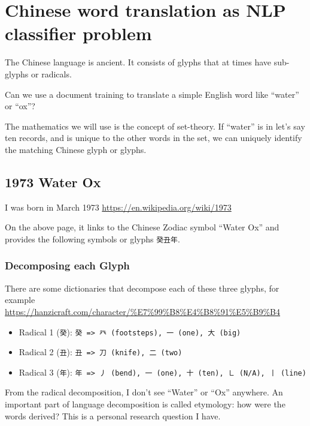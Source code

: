 \documentclass[
]{article}
\providecommand{\tightlist}{%
  \setlength{\itemsep}{0pt}\setlength{\parskip}{0pt}}
\begin{document}
\hypertarget{chinese-word-translation-as-nlp-classifier-problem}{%
\section{Chinese word translation as NLP classifier
problem}\label{chinese-word-translation-as-nlp-classifier-problem}}

The Chinese language is ancient. It consists of glyphs that at times
have sub-glyphs or radicals.

Can we use a document training to translate a simple English word like
``water'' or ``ox''?

The mathematics we will use is the concept of set-theory. If ``water''
is in let's say ten records, and is unique to the other words in the
set, we can uniquely identify the matching Chinese glyph or glyphs.

\hypertarget{water-ox}{%
\subsection{1973 Water Ox}\label{water-ox}}

I was born in March 1973 \url{https://en.wikipedia.org/wiki/1973}

On the above page, it links to the Chinese Zodiac symbol ``Water Ox''
and provides the following symbols or glyphs \texttt{癸丑年}.

\hypertarget{decomposing-each-glyph}{%
\subsubsection{Decomposing each Glyph}\label{decomposing-each-glyph}}

There are some dictionaries that decompose each of these three glyphs,
for example
\url{https://hanzicraft.com/character/\%E7\%99\%B8\%E4\%B8\%91\%E5\%B9\%B4}

\begin{itemize}
\tightlist
\item
  Radical 1 (\texttt{癸}):
  \texttt{癸\ =\textgreater{}\ 癶\ (footsteps),\ 一\ (one),\ 大\ (big)}
\item
  Radical 2 (\texttt{丑}):
  \texttt{丑\ =\textgreater{}\ 刀\ (knife),\ 二\ (two)}
\item
  Radical 3 (\texttt{年}):
  \texttt{年\ =\textgreater{}\ 丿\ (bend),\ 一\ (one),\ 十\ (ten),\ ㇗\ (N/A),\ 丨\ (line)}
\end{itemize}

From the radical decomposition, I don't see ``Water'' or ``Ox''
anywhere. An important part of language decomposition is called
etymology: how were the words derived? This is a personal research
question I have.
\end{document}
